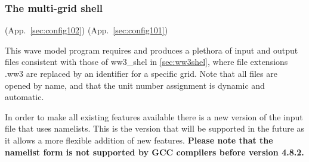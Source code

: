 \vsssub
\subsubsection{The multi-grid shell} \label{sec:ww3multi}
\vsssub

 (App.~\ref{sec:config102})
 (App.~\ref{sec:config101})

\vspace{\baselineskip}
\noindent
This wave model program requires and produces a plethora of input and output
files consistent with those of {\file ww3\_shel} in \para\ref{sec:ww3shel},
where file extensions {\file .ww3} are replaced by an identifier for a
specific grid. Note that all files are opened by name, and that the unit
number assignment is dynamic and automatic.

In order to make all existing features available there is a new version of the input file that uses namelists. This 
is the version that will be supported in the future as it allows a more flexible addition of new features. 
{\bf Please note that the namelist form is not supported by GCC compilers before version 4.8.2.} 

\pb
